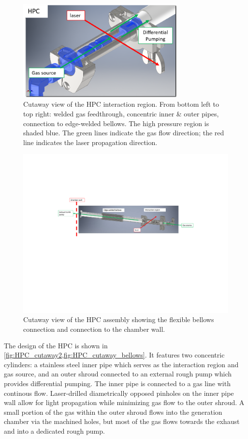 \begin{figure}
	\centering
	\includegraphics[width=0.75\textwidth]{figures/chap3/HPC_cutaway2.png}
	\caption{Cutaway view of the HPC interaction region. From bottom left to top right: welded gas feedthrough, concentric inner \& outer pipes, connection to edge-welded bellows. The high pressure region is shaded blue. The green lines indicate the gas flow direction; the red line indicates the laser propagation direction.}
	\label{fig:HPC_cutaway2}
\end{figure}

\begin{figure}
	\centering
	\includegraphics[width=1.0\textwidth]{figures/chap3/HPC_cutaway_bellows.pdf}
	\caption{Cutaway view of the HPC assembly showing the flexible bellows connection and connection to the chamber wall.}
	\label{fig:HPC_cutaway_bellows}
\end{figure}

The design of the HPC is shown in \cref{fig:HPC_cutaway2,fig:HPC_cutaway_bellows}. It features two concentric cylinders: a stainless steel inner pipe which serves as the interaction region and gas source, and an outer shroud connected to an external rough pump which provides differential pumping. The inner pipe is connected to a gas line with continous flow. Laser-drilled diametrically opposed pinholes on the inner pipe wall allow for light propagation while minimizing gas flow to the outer shroud. A small portion of the gas within the outer shroud flows into the generation chamber via the machined holes, but most of the gas flows towards the exhaust and into a dedicated rough pump.

